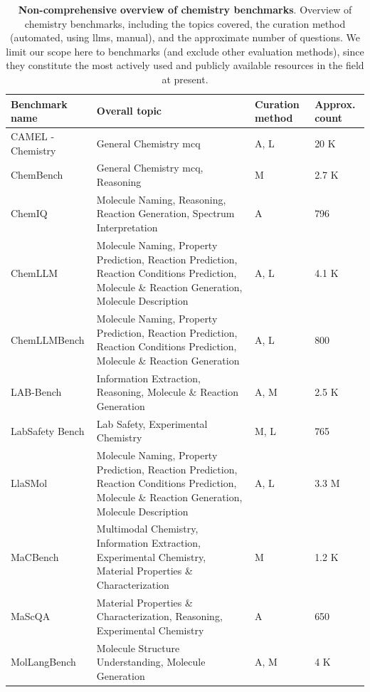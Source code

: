 \begin{table}
\centering
\footnotesize
\caption{\textbf{Non-comprehensive overview of chemistry benchmarks}. Overview of chemistry benchmarks, including the topics covered, the curation method (automated, using \glspl{llm}, manual), and the approximate number of questions. We limit our scope here to benchmarks (and exclude other evaluation methods), since they constitute the most actively used and publicly available resources in the field at present.}
\label{tab:chemistry_benchmarks}
\begin{tabular}{p{3cm} p{6.9cm} p{1.2cm} p{1cm}}
\toprule
\textbf{Benchmark name} & \textbf{Overall topic} & \textbf{Curation method} & \textbf{Approx. count} \\
\midrule
CAMEL - Chemistry \autocite{li2023camel} & General Chemistry \gls{mcq} & A, L & 20 K \\
ChemBench \autocite{mirza2024large} & General Chemistry \gls{mcq}, Reasoning & M & 2.7 K \\
ChemIQ \autocite{runcie2025assessing} & Molecule Naming, Reasoning, Reaction Generation, Spectrum Interpretation & A & 796 \\
ChemLLM \autocite{zhang2024chemllm} & Molecule Naming, Property Prediction, Reaction Prediction, Reaction Conditions Prediction, Molecule \& Reaction Generation, Molecule Description & A, L & 4.1 K \\
ChemLLMBench \autocite{guo2023large} & Molecule Naming, Property Prediction, Reaction Prediction, Reaction Conditions Prediction, Molecule \& Reaction Generation & A, L & 800 \\
LAB-Bench \autocite{laurent2024lab0bench0} & Information Extraction, Reasoning, Molecule \& Reaction Generation & A, M & 2.5 K \\
LabSafety Bench \autocite{zhou2024labsafety} & Lab Safety, Experimental Chemistry & M, L & 765 \\
LlaSMol \autocite{yu2024llasmol} & Molecule Naming, Property Prediction, Reaction Prediction, Reaction Conditions Prediction, Molecule \& Reaction Generation, Molecule Description & A, L & 3.3 M \\
MaCBench \autocite{alampara2024probing} & Multimodal Chemistry, Information Extraction, Experimental Chemistry, Material Properties \& Characterization & M & 1.2 K \\
MaScQA \autocite{zaki2023mascqa0} & Material Properties \& Characterization, Reasoning, Experimental Chemistry & A & 650 \\
MolLangBench \autocite{cai2025mollangbench} & Molecule Structure Understanding, Molecule Generation & A, M & 4 K\\

\end{tabular}
\end{table}
